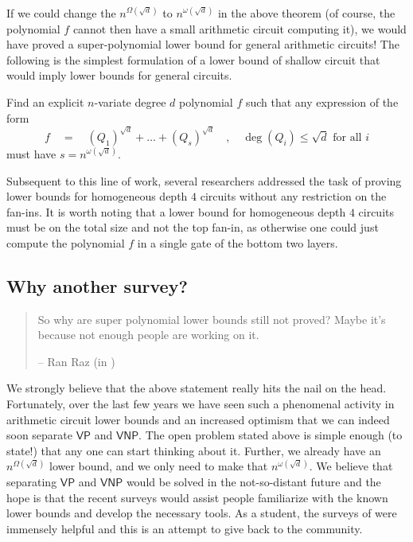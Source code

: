 \documentclass{beatcs}
\newcommand{\VP}{\mathsf{VP}}
\newcommand{\VNP}{\mathsf{VNP}}
\begin{document}
If we could change the $n^{\Omega(\sqrt{d})}$ to $n^{\omega(\sqrt{d})}$ in the above theorem (of course, the polynomial $f$ cannot then have a small arithmetic circuit computing it), we would have proved a super-polynomial lower bound for general arithmetic circuits! The following is the simplest formulation of a lower bound of shallow circuit that would imply lower bounds for general circuits. \\

\begin{mdframed}
\begin{openproblem}\label{openprob:main} Find an explicit $n$-variate degree $d$ polynomial $f$ such that any expression of the form
\[
f \quad=\quad (Q_1)^{\sqrt{d}} + \dots + (Q_{s})^{\sqrt{d}}\quad,\quad \deg(Q_i) \leq \sqrt{d} \text{ for all $i$}
\]
must have $s = n^{\omega(\sqrt{d})}$. 
\end{openproblem}
\end{mdframed}
\bigskip 

Subsequent to this line of work, several researchers addressed the task of proving lower bounds for homogeneous depth $4$ circuits without any restriction on the fan-ins. It is worth noting that a lower bound for homogeneous depth $4$ circuits must be on the total size and not the top fan-in, as otherwise one could just compute the polynomial $f$ in a single gate of the bottom two layers. 

\pagebreak[4]
\subsection*{Why another survey?}

\begin{quote}
So why are super polynomial lower bounds still not proved?  Maybe it's because not enough people are working on it.  
\begin{flushright}
-- Ran Raz (in \cite{raz10fool})
\end{flushright}
\end{quote}


We strongly believe that the above statement really hits the nail on the head. Fortunately, over the last few years we have seen such a phenomenal activity in arithmetic circuit lower bounds and an increased optimism that we can indeed soon separate $\VP$ and $\VNP$. The open problem stated above is simple enough (to state!) that any one can start thinking about it. Further, we already have an $n^{\Omega(\sqrt{d})}$ lower bound, and we only need to make that $n^{\omega(\sqrt{d})}$. We believe that separating $\VP$ and $\VNP$ would be solved in the not-so-distant future and the hope is that the recent surveys would assist people familiarize with the known lower bounds and develop the necessary tools. As a student, the surveys of \cite{sy10,ckw11} were immensely helpful and this is an attempt to give back to the community. 
\end{document}
